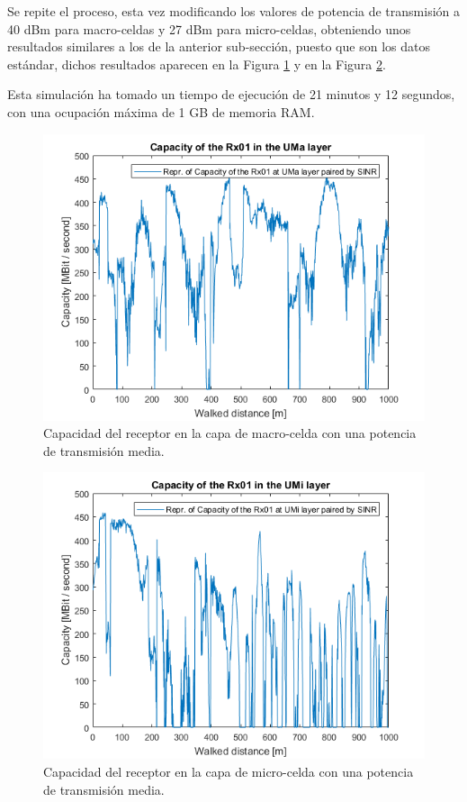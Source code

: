 Se repite el proceso, esta vez modificando los valores de potencia de transmisión a 40 dBm para macro-celdas y 27 dBm para micro-celdas, obteniendo unos resultados similares a los de la anterior sub-sección, puesto que son los datos estándar, dichos resultados aparecen en la Figura \ref{fig:simulacion_pot_med_uma} y en la Figura \ref{fig:simulacion_pot_med_umi}.

Esta simulación ha tomado un tiempo de ejecución de 21 minutos y 12 segundos, con una ocupación máxima de 1 GB de memoria RAM.

\begin{figure}[h!]
	\centering
    \includegraphics[width=0.8\linewidth]{imagenes/6_4_capacidad_uma_medio.png}
	\caption{Capacidad del receptor en la capa de macro-celda con una potencia de transmisión media.}
	\label{fig:simulacion_pot_med_uma}
\end{figure}

\begin{figure}[h!]
	\centering
    \includegraphics[width=0.8\linewidth]{imagenes/6_4_capacidad_umi_medio.png}
	\caption{Capacidad del receptor en la capa de micro-celda con una potencia de transmisión media.}
	\label{fig:simulacion_pot_med_umi}
\end{figure}

